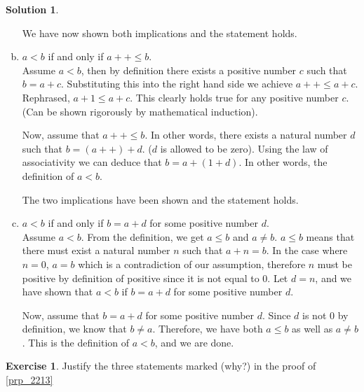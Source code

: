 \documentclass[a4paper, twocolumn]{report}
\newcounter{exercise} \numberwithin{exercise}{section}
\theoremstyle{definition}
\newtheorem{exc}[exercise]{Exercise}
\theoremstyle{solution}
\newtheorem*{sltn}{Solution}
\newcommand{\dplus}{{+}{+}} %
\begin{document}
\begin{sltn}
\begin{enumerate}[(a)]
      We have now shown both implications and the statement holds.

    \item $a < b$ if and only if $a\dplus \leq b$.\\
      [0.2cm]
      Assume $a < b$, then by definition there exists a positive number $c$
      such that $ b = a + c$.  Substituting this into the right hand side we
      achieve $a\dplus \leq a + c$. Rephrased, $a + 1 \leq a + c$. This clearly
      holds true for any positive number $c$. (Can be shown rigorously by
      mathematical induction).

      Now, assume that $a\dplus \leq b$. In other words, there exists a natural
      number $d$ such that $ b = (a\dplus) + d$. ($d$ is allowed to be zero).
      Using the law of associativity we can deduce that $b = a + (1 + d)$. In
      other words, the definition of $ a < b$.

      The two implications have been shown and the statement holds.

    \item $a < b$ if and only if $b = a + d$ for some positive number $d$.\\
      [0.2cm]
      Assume $a < b$. From the definition, we get $a \leq b$ and $ a \neq b$.
      $a \leq b$ means that there must exist a natural number $n$ such that $a
      + n = b$.  In the case where $n = 0$, $a = b$ which is a contradiction of
      our assumption, therefore $n$ must be positive by definition of positive
      since it is not equal to $0$.  Let $d = n$, and we have shown that $a <
      b$ if $b = a + d$ for some positive number $d$.

      Now, assume that $b = a + d$ for some positive number $d$. Since $d$ is
      not $0$ by definition, we know that $b \neq a$. Therefore, we have both $
      a \leq b$ as well as $a \neq b$.  This is the definition of $a < b$, and
      we are done.
  \end{enumerate}
\end{sltn}

\begin{exc}
  Justify the three statements marked (why?) in the proof of \ref{prp_2213} 
\end{exc}
\end{document}
